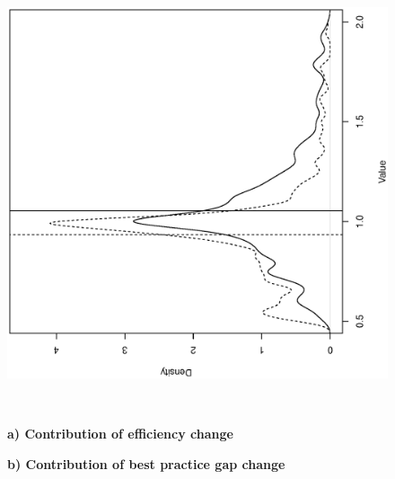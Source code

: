 \documentclass[11pt,a4paper,oneside]{article}
\begin{document}
\begin{figure}[htbp]
\begin{minipage}[c]{0.30\textwidth}
\begin{turn}{-90}
  \end{turn}
  \hspace{-35mm}
  \end{minipage}
  \begin{minipage}[c]{0.30\textwidth}
  \centering
  \begin{turn}{-90}
  \includegraphics[width=\textwidth,height=1.0\textwidth]{Direction.1/gml_EC_gml_EC_BPC_DEA_2009-2013.ps}
  \end{turn}
  \end{minipage}\\

  \begin{minipage}[c]{0.30\textwidth}
  \centering
  {\bf \footnotesize a) Contribution of efficiency change}
\end{minipage}
%
  \begin{minipage}[c]{0.30\textwidth}
  \centering
  {\bf \footnotesize b) Contribution of best practice gap change}  
\end{minipage}




\end{figure}
\end{document}
